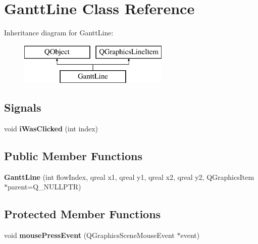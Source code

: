 \hypertarget{class_gantt_line}{}\section{Gantt\+Line Class Reference}
\label{class_gantt_line}
Inheritance diagram for Gantt\+Line\+:\begin{figure}[H]
\begin{center}
\leavevmode
\includegraphics[height=2.000000cm]{class_gantt_line}
\end{center}
\end{figure}
\subsection*{Signals}
\begin{DoxyCompactItemize}
\item 
\hypertarget{class_gantt_line_a21a3f4419468070e64b1abe0ba882a93}{}void {\bfseries i\+Was\+Clicked} (int index)\label{class_gantt_line_a21a3f4419468070e64b1abe0ba882a93}

\end{DoxyCompactItemize}
\subsection*{Public Member Functions}
\begin{DoxyCompactItemize}
\item 
\hypertarget{class_gantt_line_a9551c71e45c4d5d297d18e13701a624a}{}{\bfseries Gantt\+Line} (int flow\+Index, qreal x1, qreal y1, qreal x2, qreal y2, Q\+Graphics\+Item $\ast$parent=Q\+\_\+\+N\+U\+L\+L\+P\+T\+R)\label{class_gantt_line_a9551c71e45c4d5d297d18e13701a624a}

\end{DoxyCompactItemize}
\subsection*{Protected Member Functions}
\begin{DoxyCompactItemize}
\item 
\hypertarget{class_gantt_line_a9c8c663fbf70ef48ca8135be86f6e48b}{}void {\bfseries mouse\+Press\+Event} (Q\+Graphics\+Scene\+Mouse\+Event $\ast$event)\label{class_gantt_line_a9c8c663fbf70ef48ca8135be86f6e48b}

\end{DoxyCompactItemize}
